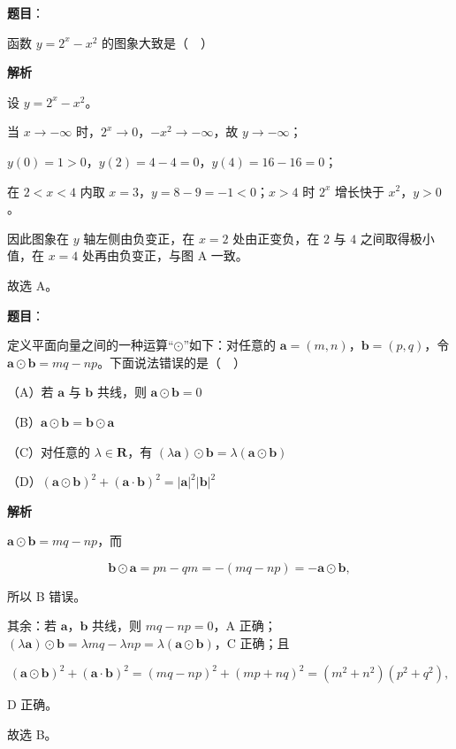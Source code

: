 \begin{answer}

\textbf{题目}：

函数 $y=2^x-x^2$ 的图象大致是（　）
\nopagebreak[4]
\begin{center}\end{center}
\nopagebreak[4]
\textbf{解析}

设 $y=2^x-x^2$。

当 $x\to-\infty$ 时，$2^x\to0$，$-x^2\to-\infty$，故 $y\to-\infty$；

$y(0)=1>0$，$y(2)=4-4=0$，$y(4)=16-16=0$；

在 $2<x<4$ 内取 $x=3$，$y=8-9=-1<0$；$x>4$ 时 $2^x$ 增长快于 $x^2$，$y>0$。

因此图象在 $y$ 轴左侧由负变正，在 $x=2$ 处由正变负，在 $2$ 与 $4$ 之间取得极小值，在 $x=4$ 处再由负变正，与图 A 一致。

故选 A。


\end{answer}
\begin{answer}

\textbf{题目}：

定义平面向量之间的一种运算“$\odot$”如下：对任意的 $\boldsymbol a=(m,n)$，$\boldsymbol b=(p,q)$，令 $\boldsymbol a\odot\boldsymbol b=mq-np$。下面说法错误的是（　）

（A）若 $\boldsymbol a$ 与 $\boldsymbol b$ 共线，则 $\boldsymbol a\odot\boldsymbol b=0$

（B）$\boldsymbol a\odot\boldsymbol b=\boldsymbol b\odot\boldsymbol a$

（C）对任意的 $\lambda\in\mathbf R$，有 $(\lambda\boldsymbol a)\odot\boldsymbol b=\lambda(\boldsymbol a\odot\boldsymbol b)$

（D）$(\boldsymbol a\odot\boldsymbol b)^2+(\boldsymbol a\cdot\boldsymbol b)^2=|\boldsymbol a|^2|\boldsymbol b|^2$

\textbf{解析}

$\boldsymbol a\odot\boldsymbol b=mq-np$，而

\nopagebreak[4]
\[\boldsymbol b\odot\boldsymbol a=pn-qm=-(mq-np)=-\boldsymbol a\odot\boldsymbol b,\]

所以 B 错误。

其余：若 $\boldsymbol a$，$\boldsymbol b$ 共线，则 $mq-np=0$，A 正确；$(\lambda\boldsymbol a)\odot\boldsymbol b=\lambda mq-\lambda np=\lambda(\boldsymbol a\odot\boldsymbol b)$，C 正确；且

\nopagebreak[4]
\[(\boldsymbol a\odot\boldsymbol b)^2+(\boldsymbol a\cdot\boldsymbol b)^2
=(mq-np)^2+(mp+nq)^2
=(m^2+n^2)(p^2+q^2),\]

D 正确。

故选 B。


\end{answer}
